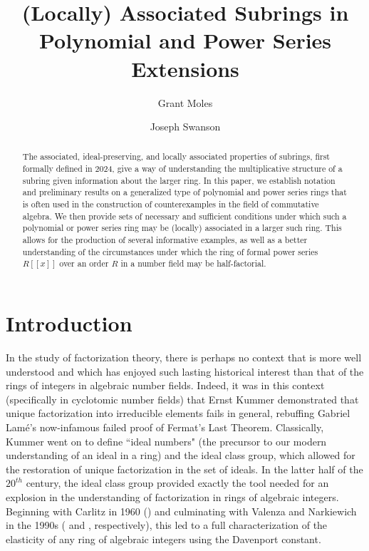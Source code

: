 \documentclass[12pt]{amsart}
\title[Associated Polynomials and Power Series]{(Locally) Associated Subrings in Polynomial and Power Series Extensions}
\author{Grant Moles\and Joseph Swanson}
\theoremstyle{definition}
\begin{document}
\begin{abstract}
    The associated, ideal-preserving, and locally associated properties of subrings, first formally defined in 2024, give a way of understanding the multiplicative structure of a subring given information about the larger ring. In this paper, we establish notation and preliminary results on a generalized type of polynomial and power series rings that is often used in the construction of counterexamples in the field of commutative algebra. We then provide sets of necessary and sufficient conditions under which such a polynomial or power series ring may be (locally) associated in a larger such ring. This allows for the production of several informative examples, as well as a better understanding of the circumstances under which the ring of formal power series $R[[x]]$ over an order $R$ in a number field may be half-factorial.
\end{abstract}

\maketitle

\section{Introduction}

In the study of factorization theory, there is perhaps no context that is more well understood and which has enjoyed such lasting historical interest than that of the rings of integers in algebraic number fields. Indeed, it was in this context (specifically in cyclotomic number fields) that Ernst Kummer demonstrated that unique factorization into irreducible elements fails in general, rebuffing Gabriel Lam\'e's now-infamous failed proof of Fermat's Last Theorem. Classically, Kummer went on to define ``ideal numbers" (the precursor to our modern understanding of an ideal in a ring) and the ideal class group, which allowed for the restoration of unique factorization in the set of ideals. In the latter half of the $20^{th}$ century, the ideal class group provided exactly the tool needed for an explosion in the understanding of factorization in rings of algebraic integers. Beginning with Carlitz in 1960 (\cite{carlitz}) and culminating with Valenza and Narkiewich in the 1990s (\cite{valenza} and \cite{narkiewicz}, respectively), this led to a full characterization of the elasticity of any ring of algebraic integers using the Davenport constant.
\end{document}
